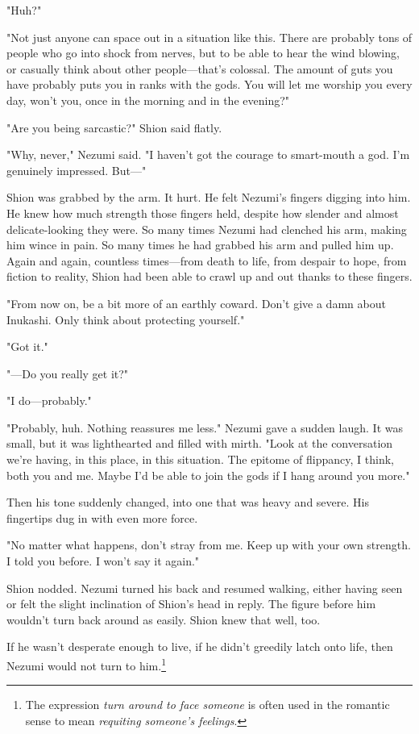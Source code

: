 "Huh?"

"Not just anyone can space out in a situation like this. There are
probably tons of people who go into shock from nerves, but to be able to
hear the wind blowing, or casually think about other people---that's
colossal. The amount of guts you have probably puts you in ranks with
the gods. You will let me worship you every day, won't you, once in the
morning and in the evening?"

"Are you being sarcastic?" Shion said flatly.

"Why, never," Nezumi said. "I haven't got the courage to smart-mouth a
god. I'm genuinely impressed. But---"

Shion was grabbed by the arm. It hurt. He felt Nezumi's fingers digging
into him. He knew how much strength those fingers held, despite how
slender and almost delicate-looking they were. So many times Nezumi had
clenched his arm, making him wince in pain. So many times he had grabbed
his arm and pulled him up. Again and again, countless times---from death
to life, from despair to hope, from fiction to reality, Shion had been
able to crawl up and out thanks to these fingers.

"From now on, be a bit more of an earthly coward. Don't give a damn
about Inukashi. Only think about protecting yourself."

"Got it."

"---Do you really get it?"

"I do---probably."

"Probably, huh. Nothing reassures me less." Nezumi gave a sudden laugh.
It was small, but it was lighthearted and filled with mirth. "Look at
the conversation we're having, in this place, in this situation. The
epitome of flippancy, I think, both you and me. Maybe I'd be able to
join the gods if I hang around you more."

Then his tone suddenly changed, into one that was heavy and severe. His
fingertips dug in with even more force.

"No matter what happens, don't stray from me. Keep up with your own
strength. I told you before. I won't say it again."

Shion nodded. Nezumi turned his back and resumed walking, either having
seen or felt the slight inclination of Shion's head in reply. The figure
before him wouldn't turn back around as easily. Shion knew that well,
too.

If he wasn't desperate enough to live, if he didn't greedily latch onto
life, then Nezumi would not turn to him.\footnote{The expression \emph{turn around to face someone} is often used in the romantic sense to mean \emph{requiting someone's feelings}.}

